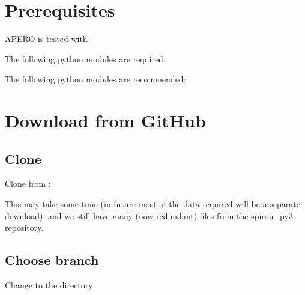 \documentclass[a4paper,10pt,english]{report}
\begin{document}
\section{Prerequisites}
\label{\detokenize{user/installation:prerequisites}}\label{\detokenize{user/installation:installation-prerequisites}}
APERO is tested with 

The following python modules are required:

\begin{sphinxVerbatim}[commandchars=\\\{\}]
\end{sphinxVerbatim}

The following python modules are recommended:

\begin{sphinxVerbatim}[commandchars=\\\{\}]
\end{sphinxVerbatim}


\section{Download from GitHub}
\label{\detokenize{user/installation:download-from-github}}\label{\detokenize{user/installation:installation-download}}

\subsection{Clone}
\label{\detokenize{user/installation:clone}}
Clone from :

\begin{sphinxVerbatim}[commandchars=\\\{\}]
   
\end{sphinxVerbatim}

This may take some time (in future most of the data required will be a separate download),
and we still have many (now redundant) files from the spirou\_py3 repository.


\subsection{Choose branch}
\label{\detokenize{user/installation:choose-branch}}\label{\detokenize{user/installation:installation-choose-branch}}
Change to the  directory
\end{document}
